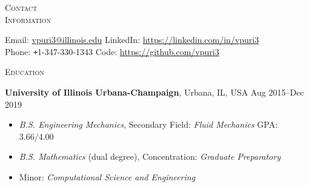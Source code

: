 \documentclass[10pt]{article}
\begin{document}
\begin{multicols}{2}
\textsc{\small Contact \\ Information}
\columnbreak

Email: \href{mailto:vpuri3@illinois.edu}{vpuri3@illinois.edu}
\hfill LinkedIn: \url{https://linkedin.com/in/vpuri3}\\
Phone: \texttt{+}1-347-330-1343                              
\hfill Code:     \url{https://github.com/vpuri3}

\end{multicols}
\vspace{-1.5em}
\begin{multicols}{2}
\textsc{\small Education}
\columnbreak

\textbf{University of Illinois Urbana-Champaign}, Urbana, IL, USA \hfill Aug 2015--Dec 2019

\vspace{-1.75em}
\begin{itemize}[label= ]
    \setlength\itemsep{-0.25em}
    \item {\sl B.S. Engineering Mechanics}, Secondary Field: {\sl Fluid Mechanics} \hfill GPA: 3.66/4.00
    \item {\sl B.S. Mathematics} (dual degree), Concentration: {\sl Graduate Preparatory}
    \item  Minor: {\sl Computational Science and Engineering}
\end{itemize}
\vspace{-2.0em}

\end{multicols}
\vspace{-1.5em}
\end{document}
